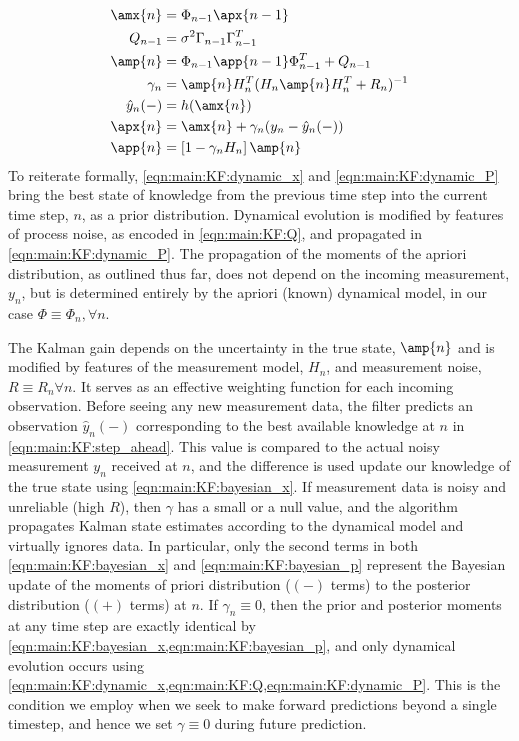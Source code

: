 \begin{align}
\amx{n} & = \Phi_{n-1} \apx{n-1} \label{eqn:main:KF:dynamic_x}\\ 
Q_{n-1} & = \sigma^2 \Gamma_{n-1}\Gamma_{n-1}^T  \label{eqn:main:KF:Q}\\
\amp{n}&= \Phi_{n-1} \app{n-1} \Phi_{n-1}^T + Q_{n-1} \label{eqn:main:KF:dynamic_P}\\
\gamma_n &= \amp{n} H_n^T(H_n\amp{n}H_n^T + R_n)^{-1} \label{eqn:main:KF:gain}\\
\hat{y}_n(-) & = h(\amx{n}) \label{eqn:main:KF:step_ahead}\\
\apx{n} &= \amx{n} + \gamma_n (y_n - \hat{y}_n(-)) \label{eqn:main:KF:bayesian_x}\\
\app{n} &= \left[1  - \gamma_n H_n \right] \amp{n} \label{eqn:main:KF:bayesian_p}
\end{align}
To reiterate formally, \cref{eqn:main:KF:dynamic_x} and \cref{eqn:main:KF:dynamic_P} bring the best state of knowledge from the previous time step into the current time step, $n$, as a prior distribution. Dynamical evolution is modified by features of process noise, as encoded in \cref{eqn:main:KF:Q}, and propagated in \cref{eqn:main:KF:dynamic_P}. The propagation of the moments of the apriori distribution, as outlined thus far, does not depend on the incoming measurement, $y_n$, but is determined entirely by the apriori (known) dynamical model, in our case $\Phi \equiv \Phi_n, \forall n$. 

The Kalman gain depends on the uncertainty in the true state, $\amp{n}$ and is modified by features of the measurement model, $H_n$, and measurement noise, $R\equiv R_n \forall n$. It serves as an effective weighting function for each incoming observation.  Before seeing any new measurement data, the filter predicts an observation $\hat{y}_n(-)$ corresponding to the best available knowledge at $n$ in \cref{eqn:main:KF:step_ahead}. This value is compared to the actual noisy measurement $y_n$ received at $n$, and the difference is used update our knowledge of the true state using \cref{eqn:main:KF:bayesian_x}. If measurement data is noisy and unreliable (high $R$), then $\gamma$ has a small or a null value, and the algorithm propagates Kalman state estimates according to the dynamical model and virtually ignores data. In particular, only the second terms in both \cref{eqn:main:KF:bayesian_x} and \cref{eqn:main:KF:bayesian_p} represent the Bayesian update of the moments of priori distribution ($(-)$ terms) to the posterior distribution ($(+)$ terms) at $n$. If $\gamma_n \equiv 0$, then the prior and posterior moments at any time step are exactly identical by \cref{eqn:main:KF:bayesian_x,eqn:main:KF:bayesian_p}, and only dynamical evolution occurs using \cref{eqn:main:KF:dynamic_x,eqn:main:KF:Q,eqn:main:KF:dynamic_P}.  This is the condition we employ when we seek to make forward predictions beyond a single timestep, and hence we set $\gamma \equiv 0$ during future prediction.


